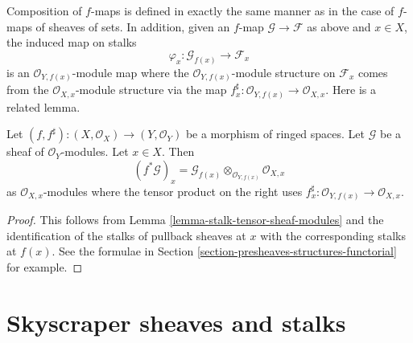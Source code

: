 \medskip\noindent
Composition of $f$-maps is defined in exactly the
same manner as in the case of $f$-maps of sheaves of
sets. In addition, given an $f$-map $\mathcal{G} \to \mathcal{F}$
as above and $x \in X$, the induced map on stalks
$$
\varphi_x : \mathcal{G}_{f(x)} \longrightarrow \mathcal{F}_x
$$
is an $\mathcal{O}_{Y, f(x)}$-module map where the
$\mathcal{O}_{Y, f(x)}$-module structure on $\mathcal{F}_x$
comes from the $\mathcal{O}_{X, x}$-module structure via
the map $f^\sharp_x : \mathcal{O}_{Y, f(x)} \to \mathcal{O}_{X, x}$.
Here is a related lemma.

\begin{lemma}
\label{lemma-stalk-pullback-modules}
Let $(f, f^\sharp) : (X, \mathcal{O}_X) \to (Y, \mathcal{O}_Y)$
be a morphism of ringed spaces.
Let $\mathcal{G}$ be a sheaf of $\mathcal{O}_Y$-modules.
Let $x \in X$. Then
$$
(f^*\mathcal{G})_x =
\mathcal{G}_{f(x)}
\otimes_{\mathcal{O}_{Y, f(x)}}
\mathcal{O}_{X, x}
$$
as $\mathcal{O}_{X, x}$-modules where the tensor product on the right
uses $f^\sharp_x : \mathcal{O}_{Y, f(x)} \to \mathcal{O}_{X, x}$.
\end{lemma}

\begin{proof}
This follows from Lemma \ref{lemma-stalk-tensor-sheaf-modules}
and the identification of the stalks of pullback sheaves
at $x$ with the corresponding stalks at $f(x)$. See the
formulae in Section \ref{section-presheaves-structures-functorial}
for example.
\end{proof}



\section{Skyscraper sheaves and stalks}
\label{section-skyscraper-sheaves}

